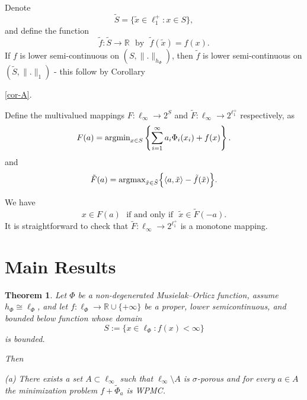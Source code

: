 \documentclass[12pt]{article}
\theoremstyle{thmstyleone}%
\newtheorem{theorem}{Theorem}
\theoremstyle{thmstyletwo}%
\theoremstyle{thmstylethree}%
\begin{document}
{{Denote
$$
\tilde S=\Big\{\tilde x\in\ell_1^+: x\in S\Big\},
$$
and define the function 
$$
\tilde f: \tilde S\rightarrow \mathbb{R} \ \ \ \mbox{by}\ \ \  \tilde f(\tilde x)=f(x).
$$
If $f$ is lower semi-continuous on $(S,\|.\|_{h_\Phi})$, then $\tilde f$ is lower semi-continuous on $(\tilde S, \|.\|_1)$ - this follow by  Corollary  {\ref{cor-A}.

 Define the multivalued mappings $F: \ell_\infty \rightarrow 2^S$ 
and $\tilde F: \ell_\infty \rightarrow 2^{\ell_1^+}$ respectively, as 
\begin{equation}\label{eq:*}
	F(a) = {\rm argmin}_{x\in S}  \left\{\sum_{i=1}^\infty  a_i\Phi_i(x_i)+ f(x) \right\}.
\end{equation}
and
\begin{equation}\label{eq:**}
	 \tilde F(a)={\rm argmax}_{\tilde x\in \tilde S}\Big \{\langle a,\tilde x \rangle -\tilde f(\tilde x)\Big \}.
\end{equation}

{%
We have 
\begin{equation}\label{F}
x\in F(a) \ \ \ \mbox {if and only if} \ \ \  \tilde x\in \tilde F(-a).
\end{equation}
It is straightforward to check that 
$\tilde{F}: \ell_\infty \rightarrow 2^{\ell_1^+}$ is a monotone mapping.

}

{%

\section{Main Results}
\begin{theorem}\label{theorem:13}
Let $\Phi$ be a non-degenerated Musielak--Orlicz function, assume $h_{\Phi}\cong \ell_{\Phi}$, 
and let $f:\ell_{\Phi}\to \mathbb{R}\cup\{+\infty\}$ be a proper, lower semicontinuous, 
and bounded below function whose domain
\[
S := \{x\in \ell_{\Phi} : f(x)<\infty\}
\]
is bounded.%
%


Then

(a) There exists a set $A\subset \ell_\infty $ such that $\ell_\infty\setminus A$ is $\sigma$-porous and for every $a\in A$
the minimization problem $f+\widetilde{\Phi}_{a}$ is WPMC. 


\end{theorem}}}}}
\end{document}
